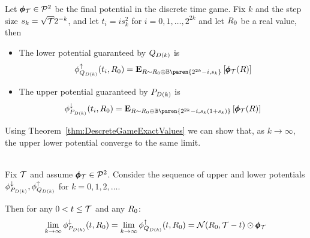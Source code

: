 \documentclass[anon,12pt]{colt2024} %
\begin{document}
\begin{theorem} \label{thm:DescreteGameExactValues}
  Let $\pmb{\phi}_{\mathcal{T}} \in {\cal P}^{2}$ be the final potential in the discrete
  time game. Fix $k$ and the step size $s_k=\sqrt{\mathcal{T}} 2^{-k}$, and let $t_i=i s_k^2$ for $i=0,1,\ldots,2^{2k}$ and
  let $R_0$ be a real value, then 
  \begin{itemize}
  \item
    The lower potential guaranteed by $Q_{D(k)}$ is
    \begin{equation} \label{eqn:lower-potential-exact}
      \lowerpotMdk(t_i,\R_0) = \E{\R \sim \R_0 \oplus
        \Binom\paren{2^{2k}-i,s_k}}{\finalPotR(\R)}
      \end{equation}
  \item
    The upper potential guaranteed by $P_{D(k)}$ is
    \begin{equation} \label{eqn:upper-potential-exact}
    \upperpotMdk(t_i,\R_0) =  \E{\R \sim \R_0 \oplus
      \Binom\paren{2^{2k}-i,s_k(1+s_k)}}{\finalPotR(\R)}
    \end{equation}
  \end{itemize}
\end{theorem}

Using Theorem~\ref{thm:DescreteGameExactValues} we can show that, as
$k \to \infty$, the upper lower potential converge to the same limit.

\begin{theorem} \label{thm:seq-of-adv-strategies}
  ~\\
  Fix $\mathcal{T}$ and assume $\pmb{\phi}_{\mathcal{T}} \in {\cal P}^{2}$. Consider the sequence of upper
  and lower potentials  $\phi_{P_{D(k)}}^{\downarrow},\phi_{Q_{D(k)}}^{\uparrow}$ for
  $k=0,1,2,\ldots$.

  Then for any  $0 < t \leq \mathcal{T}$ and any $R_0$:
  \begin{equation} \label{eqn:k-limit}
    \lim_{k \to \infty} \phi_{P_{D(k)}}^{\downarrow}(t,R_0) =
    \lim_{k \to \infty}\phi_{Q_{D(k)}}^{\uparrow}(t,R_0)=
    {\cal N}(R_0,\mathcal{T}-t) \odot \pmb{\phi}_{\mathcal{T}}
  \end{equation}
\end{theorem}
\end{document}

